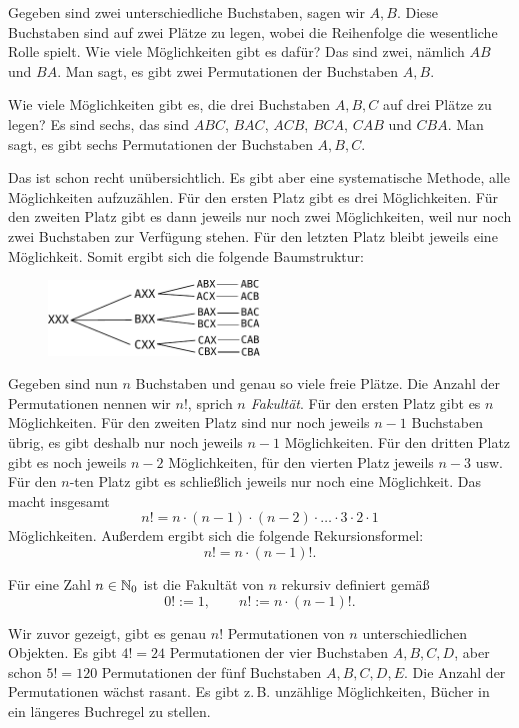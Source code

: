 Gegeben sind zwei unterschiedliche Buchstaben, sagen wir $A,B$. Diese
Buchstaben sind auf zwei Plätze zu legen, wobei die Reihenfolge die
wesentliche Rolle spielt. Wie viele Möglichkeiten gibt es dafür?
Das sind zwei, nämlich $AB$ und $BA$. Man sagt, es gibt zwei
Permutationen der Buchstaben $A,B$.

Wie viele Möglichkeiten gibt es, die drei Buchstaben $A,B,C$ auf
drei Plätze zu legen? Es sind sechs, das sind
$ABC$, $BAC$, $ACB$, $BCA$, $CAB$ und $CBA$. Man sagt, es gibt
sechs Permutationen der Buchstaben $A,B,C$.

Das ist schon recht unübersichtlich. Es gibt aber eine systematische
Methode, alle Möglichkeiten aufzuzählen. Für den ersten Platz gibt
es drei Möglichkeiten. Für den zweiten Platz gibt es dann jeweils
nur noch zwei Möglichkeiten, weil nur noch zwei Buchstaben zur
Verfügung stehen. Für den letzten Platz bleibt jeweils eine
Möglichkeit. Somit ergibt sich die folgende Baumstruktur:

\begin{figure}[h]
\begin{center}
\includegraphics[width=0.5\textwidth]{img/Perm-ABC.pdf}
\end{center}
\end{figure}

\noindent
Gegeben sind nun $n$ Buchstaben und genau so viele freie Plätze.
Die Anzahl der Permutationen nennen wir $n!$, sprich \emph{$n$ Fakultät}.
Für den ersten Platz gibt es $n$ Möglichkeiten. Für den zweiten Platz
sind nur noch jeweils $n-1$ Buchstaben übrig, es gibt deshalb nur noch
jeweils $n-1$ Möglichkeiten. Für den dritten Platz gibt es noch jeweils
$n-2$ Möglichkeiten, für den vierten Platz jeweils $n-3$ usw. Für den
$n$-ten Platz gibt es schließlich jeweils nur noch eine Möglichkeit.
Das macht insgesamt
\[n! = n\cdot (n-1)\cdot (n-2)\cdot\ldots\cdot 3\cdot 2\cdot 1\]
Möglichkeiten. Außerdem ergibt sich die folgende Rekursionsformel:
\[n! = n\cdot (n-1)!.\]
\begin{Definition}[Fakultät]
Für eine Zahl $n\in\mathbb N_0$ ist die Fakultät von $n$ rekursiv
definiert gemäß
\[0! := 1,\qquad n! := n\cdot (n-1)!.\]
\end{Definition}
Wir zuvor gezeigt, gibt es genau $n!$ Permutationen von $n$
unterschiedlichen Objekten. Es gibt $4!=24$ Permutationen
der vier Buchstaben $A,B,C,D$, aber schon $5!=120$ Permutationen der
fünf Buchstaben $A,B,C,D,E$. Die Anzahl der Permutationen wächst
rasant. Es gibt z.\,B. unzählige Möglichkeiten, Bücher in ein
längeres Buchregel zu stellen.


